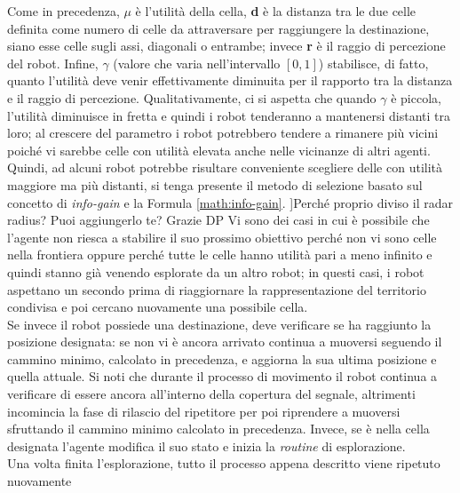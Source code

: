 Come in precedenza, $\mu$ è l'utilità della cella, \textbf{d} è la distanza tra le due celle definita come numero di celle da attraversare per raggiungere la destinazione, siano esse celle sugli assi, diagonali o entrambe; invece \textbf{r} è il raggio di percezione del robot.
Infine, $\gamma$ (valore che varia nell'intervallo $\left[0, 1\right]$) stabilisce, di fatto, quanto l'utilità deve venir effettivamente diminuita per il rapporto tra la distanza e il raggio di percezione. 
Qualitativamente, ci si aspetta che quando $\gamma$ è piccola, l'utilità diminuisce in fretta e quindi i robot tenderanno a mantenersi distanti tra loro; al crescere del parametro i robot potrebbero tendere a rimanere più vicini poiché vi sarebbe celle con utilità elevata anche nelle vicinanze di altri agenti.
Quindi, ad alcuni robot potrebbe risultare conveniente scegliere delle con utilità maggiore ma più distanti, si tenga presente il metodo di selezione basato sul concetto di \textit{info-gain} e la Formula \ref{math:info-gain}.
\todo[inline]]{Perché proprio diviso il radar radius? Puoi aggiungerlo te? Grazie DP}
Vi sono dei casi in cui è possibile che l'agente non riesca a stabilire il suo prossimo obiettivo perché non vi sono celle nella frontiera oppure perché tutte le celle hanno utilità pari a meno infinito e quindi stanno già venendo esplorate da un altro robot; in questi casi, i robot aspettano un secondo prima di riaggiornare la rappresentazione del territorio condivisa e poi cercano nuovamente una possibile cella.\\
Se invece il robot possiede una destinazione, deve verificare se ha raggiunto la posizione designata: se non vi è ancora arrivato continua a muoversi seguendo il cammino minimo, calcolato in precedenza, e aggiorna la sua ultima posizione e quella attuale.
Si noti che durante il processo di movimento il robot continua a verificare di essere ancora all'interno della copertura del segnale, altrimenti incomincia la fase di rilascio del ripetitore per poi riprendere a muoversi sfruttando il cammino minimo calcolato in precedenza.
Invece, se è nella cella designata l'agente modifica il suo stato e inizia la \textit{routine} di esplorazione.\\
Una volta finita l'esplorazione, tutto il processo appena descritto viene ripetuto nuovamente

